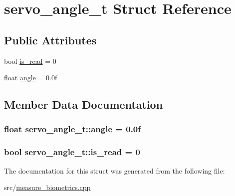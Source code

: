 \hypertarget{structservo__angle__t}{}\section{servo\+\_\+angle\+\_\+t Struct Reference}
\label{structservo__angle__t}
\subsection*{Public Attributes}
\begin{DoxyCompactItemize}
\item 
bool \hyperlink{structservo__angle__t_acb64fb4017475a2cfc25a473b78f91e7}{is\+\_\+read} = 0
\item 
float \hyperlink{structservo__angle__t_afaeab20c2e0504aba257026c70ca3bc2}{angle} = 0.\+0f
\end{DoxyCompactItemize}


\subsection{Member Data Documentation}
\subsubsection[{\texorpdfstring{angle}{angle}}]{\setlength{\rightskip}{0pt plus 5cm}float servo\+\_\+angle\+\_\+t\+::angle = 0.\+0f}\hypertarget{structservo__angle__t_afaeab20c2e0504aba257026c70ca3bc2}{}\label{structservo__angle__t_afaeab20c2e0504aba257026c70ca3bc2}
\subsubsection[{\texorpdfstring{is\+\_\+read}{is_read}}]{\setlength{\rightskip}{0pt plus 5cm}bool servo\+\_\+angle\+\_\+t\+::is\+\_\+read = 0}\hypertarget{structservo__angle__t_acb64fb4017475a2cfc25a473b78f91e7}{}\label{structservo__angle__t_acb64fb4017475a2cfc25a473b78f91e7}


The documentation for this struct was generated from the following file\+:\begin{DoxyCompactItemize}
\item 
src/\hyperlink{measure__biometrics_8cpp}{measure\+\_\+biometrics.\+cpp}\end{DoxyCompactItemize}

